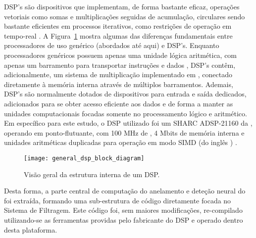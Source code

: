 DSP's são dispositivos que implementam, de forma bastante eficaz, operações
vetoriais como somas e multiplicações seguidas de acumulação, 
circulares sendo bastante eficientes em processos iterativos, como restrições
de operação em tempo-real \cite{dsp-first}. A Figura~\ref{fig:dsp-inner}
mostra algumas das diferenças fundamentais entre processadores de uso genérico
(abordados até aqui) e DSP's. Enquanto processadores genéricos possuem apenas
uma unidade lógica aritmética, com apenas um barramento para transportar
instruções e dados \cite{rt-signal-proc}, DSP's contêm, adicionalmente, um
sistema de multiplicação implementado em , conectado diretamente
à memória interna através de múltiplos barramentos. Ademais, DSP's são
normalmente dotados de dispositivos para entrada e saída dedicados,
adicionados para se obter acesso eficiente aos dados e de forma a manter as
unidades computacionais focadas somente no processamento lógico e aritmético.
Em específico para este estudo, o DSP utilizado foi um SHARC ADSP-21160 da
, operando em ponto-flutuante, com 100 MHz de ,
4 Mbits de memória interna e unidades aritméticas duplicadas para operação em
modo SIMD (do inglês )
\cite{adsp-21160-manual}. 

\begin{figure}
\begin{center}
\texttt{[image: general\_dsp\_block\_diagram]}
\end{center}
\caption{Visão geral da estrutura interna de um DSP.}
\label{fig:dsp-inner}
\end{figure}

Desta forma, a parte central de computação do anelamento e deteção neural do
 foi extraída, formando uma sub-estrutura de código 
diretamente focada no Sistema de Filtragem. Este código foi, sem maiores
modificações, re-compilado utilizando-se as ferramentas providas pelo
fabricante do DSP e operado dentro desta plataforma. 

